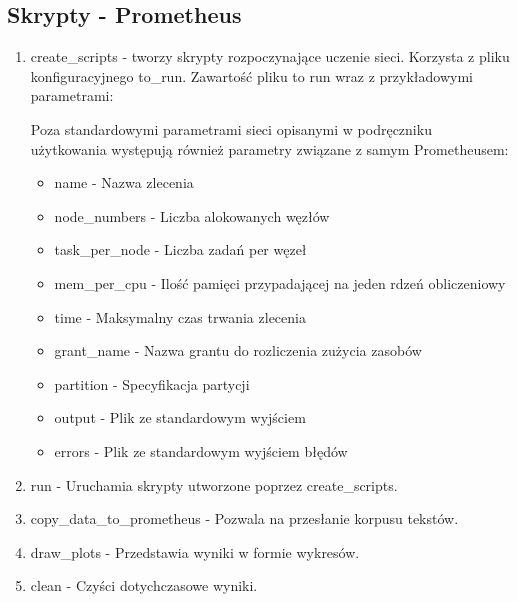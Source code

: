 \subsection{Skrypty - Prometheus}
\begin{enumerate}
	\item {create\_scripts } - 
	tworzy skrypty rozpoczynające uczenie sieci. Korzysta z pliku konfiguracyjnego to\_run.
	Zawartość pliku to run wraz z przykładowymi parametrami:
	
	\begin{import}
		[
		  {
		    "beginning": "#!/bin/sh",
		    "name": "#SBATCH -J test",
		    "node_numbers": "#SBATCH -N 1",
		    "tasks_per_node": "#SBATCH --ntasks-per-node=1",
		    "mem_per_cpu": "#SBATCH --mem-per-cpu=5GB",
		    "time": "#SBATCH --time=00:20:00",
		    "grant_name": "#SBATCH -A ap2018",
		    "partition": "#SBATCH -p plgrid",
		    "output": "#SBATCH --output=",
		    "errors": "#SBATCH --error=",
		    "hidden_size": "100",
		    "num_layers": "2",
		    "num_epochs": "5",
		    "batch_size": "40",
		    "timesteps": "50",
		    "learning_rate": "0.04",
		    "authors_size": "100",
		    "vocab_size": "48",
		    "save_path": "../results/",
		    "learning_tensors_path": "../data/dutch/tensors/known/",
		    "testing_tensors_path": "../data/dutch/tensors/known/",
		    "language": "DU"
		  }
		]
	\end{import}
	
	Poza standardowymi parametrami sieci opisanymi w podręczniku użytkowania występują również parametry
	związane z samym Prometheusem:
	\begin{itemize}
	  \item name - Nazwa zlecenia
	  \item node\_numbers - Liczba alokowanych węzłów
	  \item task\_per\_node - Liczba zadań per węzeł
	  \item mem\_per\_cpu - Ilość pamięci przypadającej na jeden rdzeń obliczeniowy
	  \item time - Maksymalny czas trwania zlecenia
	  \item grant\_name - Nazwa grantu do rozliczenia zużycia zasobów
	  \item partition - Specyfikacja partycji
	  \item output - Plik ze standardowym wyjściem
	  \item errors - Plik ze standardowym wyjściem błędów
	\end{itemize}
	
	\item {run} - 
	Uruchamia skrypty utworzone poprzez create\_scripts.
	
	\item {copy\_data\_to\_prometheus} - 
	Pozwala na przesłanie korpusu tekstów.
	
	\item {draw\_plots} -
	Przedstawia wyniki w formie wykresów.
	
	\item {clean} -
	Czyści dotychczasowe wyniki.
	
	
	
\end{enumerate}



